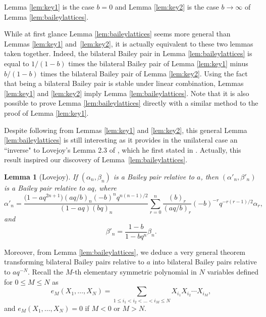 \documentclass[pdftex]{sigma}
\numberwithin{equation}{section}
\newtheorem{Lemma}[Theorem]{Lemma}
\begin{document}
\begin{Remark}
Lemma \ref{lem:key1} is the case $b=0$ and Lemma \ref{lem:key2} is the case $b \rightarrow \infty$ of Lemma \ref{lem:baileylattices}.
\end{Remark}

\begin{Remark}
While at first glance Lemma \ref{lem:baileylattices} seems more general than Lemmas \ref{lem:key1} and~\ref{lem:key2}, it is actually equivalent to these two lemmas taken together. Indeed, the bilateral Bailey pair in Lemma \ref{lem:baileylattices} is equal to $1/(1-b)$ times the bilateral Bailey pair of Lemma \ref{lem:key1} minus~${b/(1-b)}$ times the bilateral Bailey pair of Lemma \ref{lem:key2}. Using the fact that being a bilateral Bailey pair is stable under linear combination, Lemmas \ref{lem:key1} and \ref{lem:key2} imply Lemma \ref{lem:baileylattices}. Note that it is also possible to prove Lemma \ref{lem:baileylattices} directly with a similar method to the proof of Lemma \ref{lem:key1}.
\end{Remark}

Despite following from Lemmas \ref{lem:key1} and \ref{lem:key2}, this general Lemma \ref{lem:baileylattices} is still interesting as it provides in the unilateral case an ``inverse" to Lovejoy's Lemma 2.3 of \cite{Lo22}, which he first stated in \cite[equations (2.4) and (2.5)]{Lo04}. Actually, this result inspired our discovery of Lemma~\ref{lem:baileylattices}.

\begin{Lemma}[Lovejoy]\label{lem:love}
If $(\alpha_n, \beta_n)$ is a Bailey pair relative to $a$, then $(\alpha'_n, \beta'_n)$ is a Bailey pair relative to $aq$, where
\begin{equation*}
\alpha'_n= \frac{\bigl(1-aq^{2n+1}\bigr)(aq/b)_n(-b)^nq^{n(n-1)/2}}{(1-aq)(bq)_n} \sum_{r=0}^n \frac{(b)_r}{(aq/b)_r}(-b)^{-r}q^{-r(r-1)/2}\alpha_r,
\end{equation*}
and
\[
\beta'_n=\frac{1-b}{1-bq^n}\beta_n.
\]
\end{Lemma}

Moreover, from Lemma \ref{lem:baileylattices}, we deduce a very general theorem transforming bilateral Bailey pairs relative to $a$ into bilateral Bailey pairs relative to $aq^{-N}$. Recall the $M$-th elementary symmetric polynomial in $N$ variables defined for $0 \leq M \leq N$ as
\begin{equation*}e_M(X_1, \dots , X_N)= \sum_{1\leq i_1<i_2<\dots<i_M\leq N} X_{i_1} X_{i_2}\cdots X_{i_M},
\end{equation*}
and $e_M(X_1, \dots , X_N)=0$ if $M<0$ or $M>N$.
\end{document}
